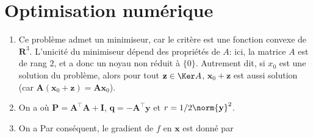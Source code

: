 \documentclass{article}
\begin{document}
\section{Optimisation numérique}

\begin{enumerate}
	\item Ce problème admet un minimiseur, car le critère est une fonction convexe de $\mathbf{R}^3$. L'unicité du minimiseur dépend des propriétés de $A$: ici, la matrice $A$ est de rang $2$, et a donc un noyau non réduit à $\{0\}$. Autrement dit, si $x_0$ est une solution du problème, alors pour tout $\mathbf{z} \in \Ker A$, $\mathbf{x}_0 + \mathbf{z}$ est aussi solution (car $\mathbf{A}(\mathbf{x}_0 + \mathbf{z}) = \mathbf{A}\mathbf{x}_0$).
	
	\item On a 
	où $\mathbf{P} = \mathbf{A}^\top \mathbf{A} + \mathbf{I}$, $\mathbf{q} = -\mathbf{A}^\top \mathbf{y}$ et $r = 1/2\norm{\mathbf{y}}^2$.
	
	\item On a
	Par conséquent, le gradient de $f$ en $\mathbf{x}$ est donné par
	

\end{enumerate}
\end{document}
